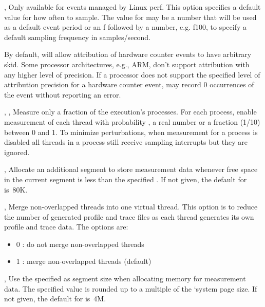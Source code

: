 \documentclass[english]{article}
\begin{document}
\begin{Description}
\item[\OptArg{-c}{howoften}, \OptArg{--count}{howoften}]
                       Only available for events managed by Linux perf. This option
                       specifies a default value for how often to sample. The value for  may be a number that will be used as a default
                       event period or an f followed by a number, e.g. f100, to specify a default sampling frequency in samples/second.

By default,  will allow attribution of hardware counter events to have arbitrary skid. 
Some processor architectures, e.g., ARM,  don't support attribution with any higher level of precision.
If a processor does not support the specified level of attribution precision for a hardware counter event, 
 may record 0 occurrences of the event without reporting an error.


\item[\OptArg{-f}{frac}, \OptArg{-fp}{frac}, \OptArg{--process-fraction}{frac}]
Measure only a fraction  of the execution's processes.
For each process, enable measurement of each thread with probability , a real number or a fraction (1/10) between 0 and 1.
To minimize perturbations, when measurement for a process is disabled
all threads in a process still receive sampling interrupts but they are ignored.

\item[\OptArg{-lm}{size}, \OptArg{--low-memsize}{size}]
Allocate an additional segment to store measurement data
whenever free space in the current segment is less than the specified .
If not given, the default for  is~80K.

\item[\OptArg{-m}{switch}, \OptArg{--merge-threads}{switch}]  Merge non-overlapped threads into one virtual thread.
                       This option is to reduce the number of generated
                       profile and trace files as each thread generates its own
                       profile and trace data. The options are:
\begin{itemize}
   \item 0 : do not merge non-overlapped threads
   \item 1 : merge non-overlapped threads (default)
\end{itemize}

\item[\OptArg{-ms}{size}, \OptArg{--memsize}{size}]
Use the specified  as segment size when allocating memory for measurement data.
The specified value is rounded up to a multiple of the `system page size.
If not given, the default for  is~4M.


\end{Description}
\end{document}
